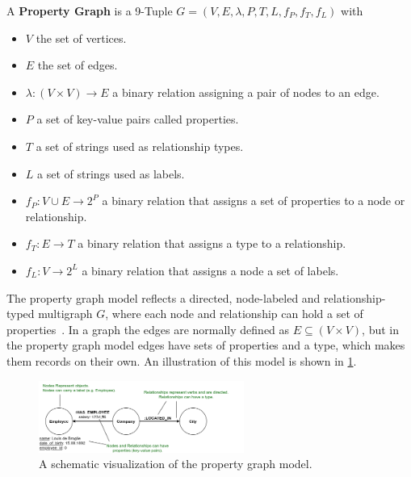         A \textbf{Property Graph} is a 9-Tuple $G = (V, E, \lambda, P, T, L, f_P, f_T, f_L)$ with 
        \begin{itemize}
            \item $V$ the set of vertices.
            \item $E$ the set of edges.
            \item $\lambda: (V \times V) \rightarrow E$ a binary relation assigning a pair of nodes to an edge.
            \item $P$ a set of key-value pairs called properties.
            \item $T$ a set of strings used as relationship types.
            \item $L$ a set of strings used as labels.
            \item $f_P: V \cup E \rightarrow 2^P$ a binary relation that assigns a set of properties to a node or relationship.
            \item $f_T: E \rightarrow T$ a binary relation that assigns a type to a relationship.
            \item  $f_L: V \rightarrow 2^L$ a binary relation that assigns a node a set of labels.
        \end{itemize} 
        \smallskip
        The property graph model reflects a directed, node-labeled and relationship-typed multigraph $G$, where each node and relationship can hold a set of properties~\cite{angles2018property, rodriguez2012graph, Rodriguez2010ConstructionsFD}.
        In a graph the edges are normally defined as $E \subseteq (V \times V)$, but in the property graph model edges have sets of properties and a type, which makes them records on their own. 
        An illustration of this model is shown in \ref{propertygraph}.
        
        \begin{figure}[htp]
            \begin{center}
                \includegraphics[keepaspectratio,width=0.6\textwidth]{img/04-databases/property_graph_elements.png}
            \end{center}
            \caption{A schematic visualization of the property graph model.} 
            \label{propertygraph}
        \end{figure}

